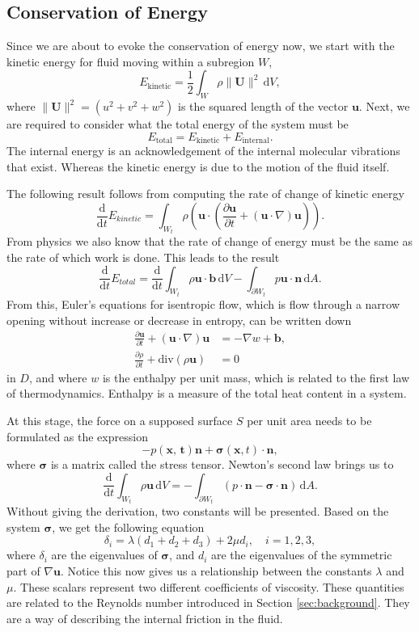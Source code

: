 \documentclass[undefended]{sfuthesis}
\begin{document}
\subsection{Conservation of Energy}
\label{sec:ConservationOfEnergy}

Since we are about to evoke the conservation of energy now, we start with the kinetic energy for fluid moving within a subregion $W$, \[E_{\mathrm{kinetic}} = \frac{1}{2} \int_W \rho \|\textbf{U}\|^2 \,\mathrm{d} V,\] where $\|\textbf{U}\|^2 = (u^2 + v^2 + w^2)$ is the squared length of the vector $\textbf{u}.$ Next, we are required to consider what the total energy of the system must be \[E_{\mathrm{total}} = E_{\mathrm{kinetic}} + E_{\mathrm{internal}}.\] The internal energy is an acknowledgement of the internal molecular vibrations that exist. Whereas the kinetic energy is due to the motion of the fluid itself.

The following result follows from computing the rate of change of kinetic energy \[ \frac{\mathrm{d}}{\mathrm{d} t} E_{kinetic} = \int_{W_t} \rho \left(\textbf{u} \cdot \left(\frac{\partial \textbf{u}}{\partial t} + (\textbf{u} \cdot \nabla) \textbf{u} \right)\right). \] From physics we also know that the rate of change of energy must be the same as the rate of which work is done. This leads to the result \[\frac{\mathrm{d}}{\mathrm{d} t} E_{total} = \frac{\mathrm{d}}{\mathrm{d} t} \int_{W_t} \rho \textbf{u} \cdot \textbf{b} \,\mathrm{d} V - \int_{\partial W_t} p \textbf{u} \cdot \textbf{n} \,\mathrm{d} A.\] From this, Euler's equations for isentropic flow, which is flow through a narrow opening without increase or decrease in entropy, can be written down
\begin{align*}
\frac{\partial \textbf{u}}{\partial t} + (\textbf{u} \cdot \nabla)\textbf{u} &= - \nabla w + \textbf{b}, \\
\frac{\partial \rho}{\partial t} + \mathrm{div} (\rho \textbf{u}) &= 0
\end{align*}
in $D$, and where $w$ is the enthalpy per unit mass, which is related to the first law of thermodynamics. Enthalpy is a measure of the total heat content in a system.

At this stage, the force on a supposed surface $S$ per unit area needs to be formulated as the expression \[ - p(\textbf{x, t}) \textbf{n} + \bm{\sigma} (\textbf{x}, t) \cdot \textbf{n},\] where $\bm{\sigma}$ is a matrix called the stress tensor. Newton's second law brings us to \[\frac{\mathrm{d}}{\mathrm{d} t} \int_{W_t} \rho \textbf{u} \,\mathrm{d} V = - \int_{\partial W_t} (p \cdot \textbf{n} - \bm{\sigma} \cdot \textbf{n}) \,\mathrm{d} A.\] Without giving the derivation, two constants will be presented. Based on the system $\bm{\sigma}$, we get the following equation \[\delta_i = \lambda (d_1 + d_2 + d_3) + 2 \mu d_i, \quad i = 1, 2, 3,\] where $\delta_i$ are the eigenvalues of $\bm{\sigma}$, and $d_i$ are the eigenvalues of the symmetric part of $\nabla \textbf{u}$. Notice this now gives us a relationship between the constants $\lambda$ and $\mu.$ These scalars represent two different coefficients of viscosity. These quantities are related to the Reynolds number introduced in Section \ref{sec:background}. They are a way of describing the internal friction in the fluid.
\end{document}
